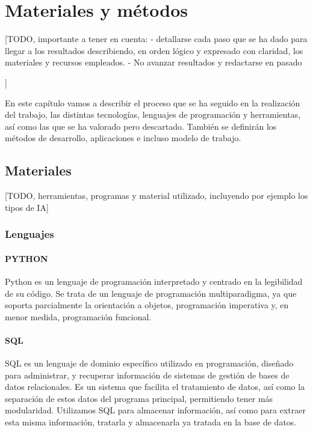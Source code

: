 \chapter{Materiales y métodos}
\label{cap:Materiales y metodos}

[TODO, importante a tener en cuenta:
 -  detallarse cada paso que se ha dado para llegar a los resultados describiendo, en orden lógico y expresado con claridad, los materiales y recursos empleados. 
 - No avanzar resultados y redactarse en pasado

]

En este capítulo vamos a describir el proceso que se ha seguido en la realización del trabajo, las distintas tecnologías, lenguajes de programación y herramientas, así como las que se ha valorado pero descartado. También se definirán los métodos de desarrollo, aplicaciones e incluso modelo de trabajo.



\section{Materiales}

[TODO, herramientas, programas y material utilizado, incluyendo por ejemplo los tipos de IA]

\subsection{Lenguajes} 

\subsubsection*{PYTHON}
Python es un lenguaje de programación interpretado y centrado en la legibilidad de su código. Se trata de un lenguaje de programación multiparadigma, ya que soporta parcialmente la orientación a objetos, programación imperativa y, en menor medida, programación funcional.

\subsubsection*{SQL}
SQL es un lenguaje de dominio específico utilizado en programación, diseñado para administrar, y recuperar información de sistemas de gestión de bases de datos relacionales. Es un sistema que facilita el tratamiento de datos, así como la separación de estos datos del programa principal, permitiendo tener más modularidad.
Utilizamos SQL para almacenar información, así como para extraer esta misma información, tratarla y almacenarla ya tratada en la base de datos. 

